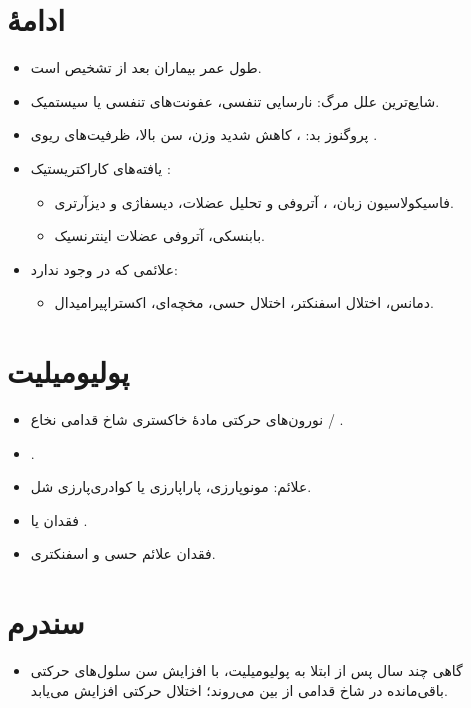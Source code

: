 \documentclass[a4paper,12pt]{extbook}
\begin{document}
\section*{ادامهٔ }
\begin{itemize}
\item طول عمر بیماران بعد از تشخیص  است.
\item شایع‌ترین علل مرگ: نارسایی تنفسی، عفونت‌های تنفسی یا سیستمیک.
\item پروگنوز بد: ، کاهش شدید وزن، سن بالا، ظرفیت‌های ریوی \MNDen{$\downarrow$}.
\item یافته‌های کاراکتریستیک :
\begin{itemize}
\item فاسیکولاسیون زبان، ، آتروفی و تحلیل عضلات، دیسفاژی و دیزآرتری.
\item بابنسکی، آتروفی عضلات اینترنسیک.
\end{itemize}
\item علائمی که در  وجود ندارد:
\begin{itemize}
\item دمانس، اختلال اسفنکتر، اختلال حسی، مخچه‌ای، اکستراپیرامیدال.
\end{itemize}
\end{itemize}

\section*{پولیومیلیت}
\begin{itemize}
\item نورون‌های حرکتی مادهٔ خاکستری شاخ قدامی نخاع / .
\item {}.
\item علائم: مونوپارزی، پاراپارزی یا کوادری‌پارزی شل.
\item فقدان یا .
\item فقدان علائم حسی و اسفنکتری.
\end{itemize}

\section*{سندرم }
\begin{itemize}
\item گاهی چند سال پس از ابتلا به پولیومیلیت، با افزایش سن سلول‌های حرکتی باقی‌مانده در شاخ قدامی از بین می‌روند؛ اختلال حرکتی افزایش می‌یابد.
\end{itemize}

\endgroup
\ifMNDStandalone
  \expandafter\enddocument
\fi
\end{document}
